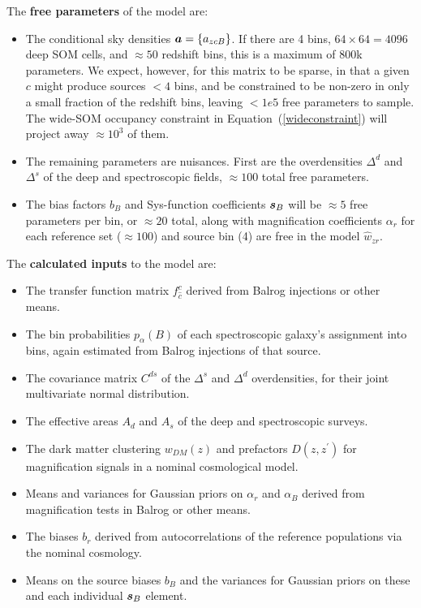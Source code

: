 \documentclass[11pt,preprint,flushrt]{aastex631}
\newcommand{\veca}{\mbox{\boldmath $a$}}
\newcommand{\vecs}{\mbox{\boldmath $s$}}
\begin{document}
The \textbf{free parameters} of the model are:
\begin{itemize}
  \item The conditional sky densities $\veca = \{a_{zcB}\}$.  If there
    are 4 bins, $64\times64=4096$ deep SOM cells, and $\approx50$
    redshift bins, this is a maximum of 800k parameters.  We expect,
    however, for this matrix to be sparse, in that a given $c$ might
    produce sources $<4$ bins, and be constrained to be non-zero in
    only a small fraction of the redshift bins, leaving $<1e5$ free
    parameters to sample.  The wide-SOM occupancy constraint in
    Equation~(\ref{wideconstraint}) will project away $\approx10^3$ of
    them.
  \item The remaining parameters are nuisances.  First are the
    overdensities $\Delta^d$ and $\Delta^s$ of the deep and
    spectroscopic fields, $\approx100$ total free parameters.
  \item The bias factors $b_{B}$ and Sys-function coefficients
    $\vecs_B$ will be $\approx 5$ free parameters per bin, or $\approx
    20$ total, along with magnification coefficients $\alpha_r$ for
    each reference set ($\approx 100$) and source bin (4) are free in
    the model $\hat w_{zr}.$
\end{itemize}
  
The \textbf{calculated inputs} to the model are:
\begin{itemize}
  \item The transfer function matrix $f^c_{\hat c}$ derived from
    Balrog injections or other means.
  \item The bin probabilities $p_\alpha(B)$ of each spectroscopic
    galaxy's assignment into bins, again estimated from Balrog
    injections of that source.
  \item The covariance matrix $C^{ds}$ of the $\Delta^s$ and
    $\Delta^d$ overdensities, for their joint multivariate normal
    distribution. 
  \item The effective areas $A_d$ and $A_s$ of the deep and
    spectroscopic surveys.
  \item The dark matter clustering $w_{DM}(z)$ and prefactors
    $D(z,z^\prime)$ for magnification signals in a nominal
    cosmological model.
  \item Means and variances for Gaussian priors on $\alpha_r$ and $\alpha_B$ derived from
    magnification tests in Balrog or other means.
  \item The biases $b_r$ derived from autocorrelations of the
    reference populations via the nominal cosmology.
  \item Means on the source biases $b_B$ and the variances for
    Gaussian priors on these and each individual $\vecs_B$ element.
\end{itemize}
  
\end{document}
